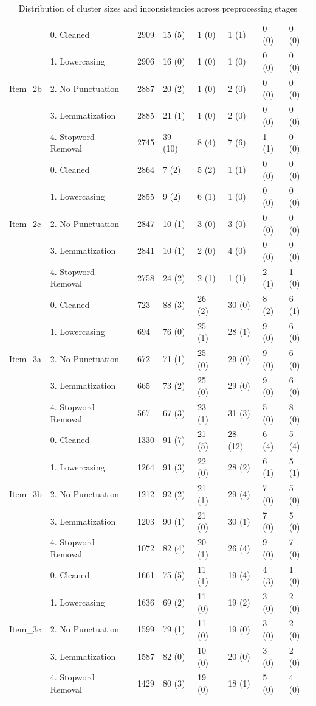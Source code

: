 \begin{longtable}{llllllll}
   \hline 
 & 0. Cleaned & 2909 & 15 (5) & 1 (0) & 1 (1) & 0 (0) & 0 (0) \\ 
   & 1. Lowercasing & 2906 & 16 (0) & 1 (0) & 1 (0) & 0 (0) & 0 (0) \\ 
  Item\_2b & 2. No Punctuation & 2887 & 20 (2) & 1 (0) & 2 (0) & 0 (0) & 0 (0) \\ 
   & 3. Lemmatization & 2885 & 21 (1) & 1 (0) & 2 (0) & 0 (0) & 0 (0) \\ 
   & 4. Stopword Removal & 2745 & 39 (10) & 8 (4) & 7 (6) & 1 (1) & 0 (0) \\ 
   \hline 
 & 0. Cleaned & 2864 & 7 (2) & 5 (2) & 1 (1) & 0 (0) & 0 (0) \\ 
   & 1. Lowercasing & 2855 & 9 (2) & 6 (1) & 1 (0) & 0 (0) & 0 (0) \\ 
  Item\_2c & 2. No Punctuation & 2847 & 10 (1) & 3 (0) & 3 (0) & 0 (0) & 0 (0) \\ 
   & 3. Lemmatization & 2841 & 10 (1) & 2 (0) & 4 (0) & 0 (0) & 0 (0) \\ 
   & 4. Stopword Removal & 2758 & 24 (2) & 2 (1) & 1 (1) & 2 (1) & 1 (0) \\ 
   \hline 
 & 0. Cleaned & 723 & 88 (3) & 26 (2) & 30 (0) & 8 (2) & 6 (1) \\ 
   & 1. Lowercasing & 694 & 76 (0) & 25 (1) & 28 (1) & 9 (0) & 6 (0) \\ 
  Item\_3a & 2. No Punctuation & 672 & 71 (1) & 25 (0) & 29 (0) & 9 (0) & 6 (0) \\ 
   & 3. Lemmatization & 665 & 73 (2) & 25 (0) & 29 (0) & 9 (0) & 6 (0) \\ 
   & 4. Stopword Removal & 567 & 67 (3) & 23 (1) & 31 (3) & 5 (0) & 8 (0) \\ 
   \hline 
 & 0. Cleaned & 1330 & 91 (7) & 21 (5) & 28 (12) & 6 (4) & 5 (4) \\ 
   & 1. Lowercasing & 1264 & 91 (3) & 22 (0) & 28 (2) & 6 (1) & 5 (1) \\ 
  Item\_3b & 2. No Punctuation & 1212 & 92 (2) & 21 (1) & 29 (4) & 7 (0) & 5 (0) \\ 
   & 3. Lemmatization & 1203 & 90 (1) & 21 (0) & 30 (1) & 7 (0) & 5 (0) \\ 
   & 4. Stopword Removal & 1072 & 82 (4) & 20 (1) & 26 (4) & 9 (0) & 7 (0) \\ 
   \hline 
 & 0. Cleaned & 1661 & 75 (5) & 11 (1) & 19 (4) & 4 (3) & 1 (0) \\ 
   & 1. Lowercasing & 1636 & 69 (2) & 11 (0) & 19 (2) & 3 (0) & 2 (0) \\ 
  Item\_3c & 2. No Punctuation & 1599 & 79 (1) & 11 (0) & 19 (0) & 3 (0) & 2 (0) \\ 
   & 3. Lemmatization & 1587 & 82 (0) & 10 (0) & 20 (0) & 3 (0) & 2 (0) \\ 
   & 4. Stopword Removal & 1429 & 80 (3) & 19 (0) & 18 (1) & 5 (0) & 4 (0) \\ 
   \hline
\hline
\caption{Distribution of cluster sizes and inconsistencies across preprocessing stages} 
\label{tab:bin_table}
\end{longtable}
